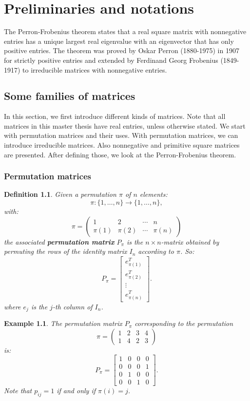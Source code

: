\documentclass[a4paper,11pt]{report}
\newtheorem{example}[theorem]{Example}
\newtheorem{definition}[theorem]{Definition}
\begin{document}
 

\tableofcontents
\newpage
\chapter{Preliminaries and notations}


The Perron-Frobenius theorem states that a real square matrix with nonnegative entries has a unique largest real eigenvalue with an eigenvector 
that has only positive entries. The theorem was proved by Oskar 
Perron (1880-1975) in 1907 for strictly positive entries and extended by 
Ferdinand Georg Frobenius (1849-1917) to irreducible matrices with nonnegative 
entries. 

\section{Some families of matrices}
In this section, we first introduce different kinds of matrices. Note that all matrices in this master thesis have real entries,
unless otherwise stated. We start with permutation matrices and their uses. 
With permutation matrices, we can introduce irreducible matrices. Also nonnegative and primitive square matrices are presented. After defining 
those, we look at the Perron-Frobenius theorem. 
\subsection{Permutation matrices}
\begin{definition}\label{petmruation}
  Given a permutation $\pi$ of $n$ elements:
  $$\pi: \{1,\ldots,n\} \to \{1,\ldots,n\},$$
  with:
    $$\pi = \begin{pmatrix} 1 & 2 & \cdots & n \\ \pi(1) & \pi(2) & \cdots & \pi(n) \end{pmatrix} $$
  the associated \textbf{permutation matrix} $P_\pi$ is the $n\times n$-matrix 
  obtained by permuting the rows of the identity matrix $I_n$ according to $\pi$. 
  So:
 $$P_\pi = \begin{bmatrix} 
e^T_{\pi(1)}  \\
e^T_{\pi(2)}  \\
\vdots  \\
e^T_{\pi(n)}  
\end{bmatrix}.$$
 where $e_{j}$ is the $j$-th column of $I_n$.
 \end{definition}
\begin{example}
  The permutation matrix $P_\pi$ corresponding to the permutation  $$\pi = \begin{pmatrix} 1 & 2 & 3 & 4 \\ 1 & 4 & 2 & 3 \end{pmatrix} $$
  is:
  $$P_\pi = \begin{bmatrix} 
1 & 0 & 0 & 0  \\
0 & 0 & 0 & 1  \\
0 & 1 & 0 & 0  \\
0 & 0 & 1 & 0  
\end{bmatrix}.$$
Note that $p_{ij} = 1$ if and only if $\pi(i) = j$. 
\end{example}
\end{document}

